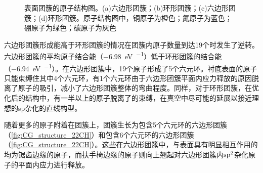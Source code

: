     \begin{figure}\ContinuedFloat
        \caption{表面团簇的原子结构图。(a)六边形团簇；(b)环形团簇；(c)六边形团簇；(d)环形团簇。原子结构图中，铜原子为橙色；氮原子为蓝色；硼原子为绿色；碳原子为灰色}
        \label{fig:CG_CG_structure_14-19C}
    \end{figure}


    六边形团簇形成能高于环形团簇的情况在团簇内原子数量到达19个时发生了逆转。六边形团簇的平均原子结合能（\SI{-6.98}{\electronvolt\per\atom}）低于环形团簇的结合能（\SI{-6.94}{\electronvolt\per\atom}）。在六边形团簇中，19个原子形成了5个六元环。衬底表面的原子只能束缚住其中4个六元环，有1个六元环由于六边形团簇平面内应力释放的原因脱离了原子的吸引，减小了六边形团簇整体的弯曲程度。同样，对于环形团簇，在优化后的结构中，有一半以上的原子脱离了的束缚，在真空中尽可能的延展以接近理想的sp杂化的直线构型。

    随着更多的原子附着在团簇上，团簇生长为包含5个六元环的六边形团簇（\ref{fig:CG_structure_22CH}）和包含6个六元环的六边形团簇（\ref{fig:CG_structure_22CH}）。这些在六边形团簇中，与表面具有明显相互作用的均为锯齿边缘的原子，而扶手椅边缘的原子则向上翘起对六边形团簇内$\rm sp^2$杂化原子的平面内应力进行释放。

